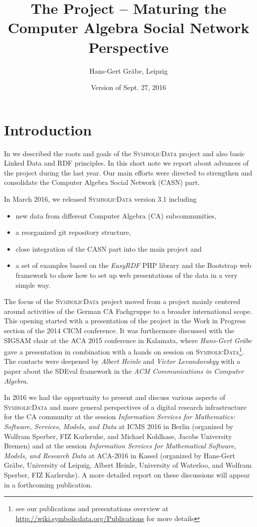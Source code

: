 \documentclass[a4paper,11pt]{article}
\title{The {\SD} Project -- Maturing the Computer Algebra Social Network
  Perspective}
\author{Hans-Gert Gr\"abe, Leipzig}
\date{Version of Sept. 27, 2016}
\def\SD{\textsc{SymbolicData}}
\begin{document}
\maketitle

\section{Introduction}

In \cite{car-55,cicm-14,icms-16,aca-16} we described the roots and goals of the
{\SD} project and also basic Linked Data and RDF principles.  In
this short note we report about advances of the project during the last year.
Our main efforts were directed to strengthen and consolidate the Computer
Algebra Social Network (CASN) part.

In March 2016, we released {\SD} version 3.1 including
\begin{itemize}
\item new data from different Computer Algebra (CA) subcommunities,
\item a reorganized git repository structure,
\item close integration of the CASN part into the main project and
\item a set of examples based on the \emph{EasyRDF} PHP library and the
  Bootstrap web framework to show how to set up web presentations of the data
  in a very simple way.
\end{itemize}

The focus of the {\SD} project moved from a project mainly centered around
activities of the German CA Fachgruppe to a broader international scope. This
opening started with a presentation of the project in the Work in Progress
section of the 2014 CICM conference. It was furthermore discussed with the
SIGSAM chair at the ACA 2015 conference in Kalamata, where {\emph{Hans-Gert
    Gr\"abe}} gave a presentation in combination with a hands on session on
{\SD}\footnote{see our publications and presentations overview at
  \url{http://wiki.symbolicdata.org/Publications} for more details}.  The
contacts were deepened by \emph{Albert Heinle} and \emph{Victor Levandovskyy}
with a paper \cite{heinle-15} about the SDEval framework in the \emph{ACM
  Communications in Computer Algebra}.

In 2016 we had the opportunity to present and discuss various aspects of {\SD}
and more general perspectives of a digital research infrastructure for the CA
community at the session \emph{Information Services for Mathematics: Software,
  Services, Models, and Data} at ICMS 2016 in Berlin (organized by Wolfram
Sperber, FIZ Karlsruhe, and Michael Kohlhase, Jacobs University Bremen) and at
the session \emph{Information Services for Mathematical Software, Models, and
  Research Data} at ACA-2016 in Kassel (organized by Hans-Gert Gr\"abe,
University of Leipzig, Albert Heinle, University of Waterloo, and Wolfram
Sperber, FIZ Karlsruhe).  A more detailed report on these discussions will
appear in a forthcoming publication.
\end{document}
